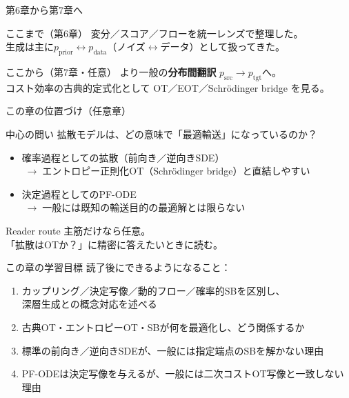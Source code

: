 

\begin{frame}{第6章から第7章へ}
    \begin{block}{ここまで（第6章）}
        変分／スコア／フローを統一レンズで整理した。\\
        生成は主に$p_{\mathrm{prior}}\leftrightarrow p_{\mathrm{data}}$（ノイズ$\leftrightarrow$データ）として扱ってきた。
    \end{block}
    \begin{block}{ここから（第7章・任意）}
        より一般の\textbf{分布間翻訳} $p_{\mathrm{src}}\to p_{\mathrm{tgt}}$へ。\\
        コスト効率の古典的定式化として OT／EOT／Schrödinger bridge を見る。
    \end{block}
\end{frame}
\asmain
\begin{frame}{この章の位置づけ（任意章）}
    \begin{block}{中心の問い}
        拡散モデルは、どの意味で「最適輸送」になっているのか？
    \end{block}
    \begin{itemize}
        \item 確率過程としての拡散（前向き／逆向きSDE）\\
        $\;\to\;$エントロピー正則化OT（Schrödinger bridge）と直結しやすい
        \item 決定過程としてのPF-ODE\\
        $\;\to\;$一般には既知の輸送目的の最適解とは限らない
    \end{itemize}
    \begin{exampleblock}{Reader route}
        主筋だけなら任意。\\
        「拡散はOTか？」に精密に答えたいときに読む。
    \end{exampleblock}
\end{frame}
\asmain
\begin{frame}{この章の学習目標}
    読了後にできるようになること：
    \begin{enumerate}
        \item カップリング／決定写像／動的フロー／確率的SBを区別し、\\
        深層生成との概念対応を述べる
        \item 古典OT・エントロピーOT・SBが何を最適化し、どう関係するか
        \item 標準の前向き／逆向きSDEが、一般には指定端点のSBを解かない理由
        \item PF-ODEは決定写像を与えるが、一般には二次コストOT写像と一致しない理由
    \end{enumerate}
\end{frame}
